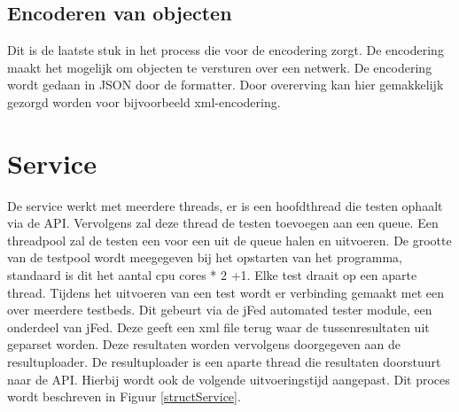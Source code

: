 \subsection{Encoderen van objecten}
\npar
Dit is de laatste stuk in het process die voor de encodering zorgt. De encodering maakt het mogelijk om objecten te versturen over een netwerk. De encodering wordt gedaan in JSON door de formatter. Door overerving kan hier gemakkelijk gezorgd worden voor bijvoorbeeld xml-encodering.
\section{Service}
\npar
De service werkt met meerdere threads, er is een hoofdthread die testen ophaalt via de API. Vervolgens zal deze thread de testen toevoegen aan een queue. Een threadpool zal de testen een voor een uit de queue halen en uitvoeren. De grootte van de testpool wordt meegegeven bij het opstarten van het programma, standaard is dit het aantal cpu cores * 2 +1.
\npar
Elke test draait op een aparte thread. Tijdens het uitvoeren van een test wordt er verbinding gemaakt met een over meerdere testbeds. Dit gebeurt via de jFed automated tester module, een onderdeel van jFed. Deze geeft een xml file terug waar de tussenresultaten uit geparset worden. Deze resultaten worden vervolgens doorgegeven aan de resultuploader.
\npar
De resultuploader is een aparte thread die resultaten doorstuurt naar de API. Hierbij wordt ook de volgende uitvoeringstijd aangepast. Dit proces wordt beschreven in Figuur \ref{structService}.
\clearpage
